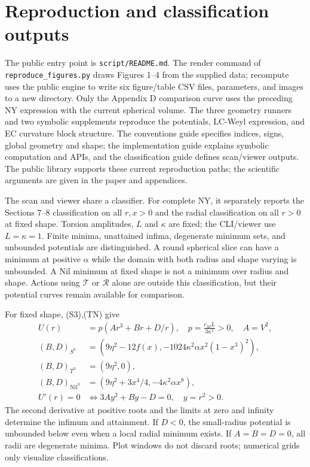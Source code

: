 \section{Reproduction and classification outputs}
\label{sec:revised12}

The public entry point is \texttt{script/README.md}. The render command of \texttt{reproduce\_figures.py} draws Figures 1--4 from the supplied data; recompute uses the public engine to write six figure/table CSV files, parameters, and images to a new directory. Only the Appendix D comparison curve uses the preceding NY expression with the current spherical volume. The three geometry runners and two symbolic supplements reproduce the potentials, LC-Weyl expression, and EC curvature block structure. The conventions guide specifies indices, signs, global geometry and shape; the implementation guide explains symbolic computation and APIs, and the classification guide defines scan/viewer outputs. The public library supports these current reproduction paths; the scientific arguments are given in the paper and appendices.

The scan and viewer share a classifier. For complete NY, it separately reports the Sections 7--8 classification on all $r,x>0$ and the radial classification on all $r>0$ at fixed shape. Torsion amplitudes, $L$ and $\kappa$ are fixed; the CLI/viewer use $L=\kappa=1$. Finite minima, unattained infima, degenerate minimum sets, and unbounded potentials are distinguished. A round spherical slice can have a minimum at positive $\alpha$ while the domain with both radius and shape varying is unbounded. A Nil minimum at fixed shape is not a minimum over radius and shape. Actions using $\mathcal T$ or $\mathcal R$ alone are outside this classification, but their potential curves remain available for comparison.

For fixed shape, (S3),(TN) give
\begin{equation}
\begin{aligned}
U(r)&=p(Ar^3+Br+D/r),\quad p=\frac{c_ML}{3\kappa^2}>0,\quad A=V^2,\\
(B,D)_{S^3}&=(9\eta^2-12f(x),-1024\kappa^2\alpha x^2(1-x^3)^2),\\
(B,D)_{T^3}&=(9\eta^2,0),\\
(B,D)_{\mathrm{Nil}^3}&=(9\eta^2+3x^4/4,-4\kappa^2\alpha x^8),\\
U'(r)=0&\iff 3Ay^2+By-D=0,\quad y=r^2>0.
\end{aligned}\tag{RAD}
\end{equation}
The second derivative at positive roots and the limits at zero and infinity determine the infimum and attainment. If $D<0$, the small-radius potential is unbounded below even when a local radial minimum exists. If $A=B=D=0$, all radii are degenerate minima. Plot windows do not discard roots; numerical grids only visualize classifications.

